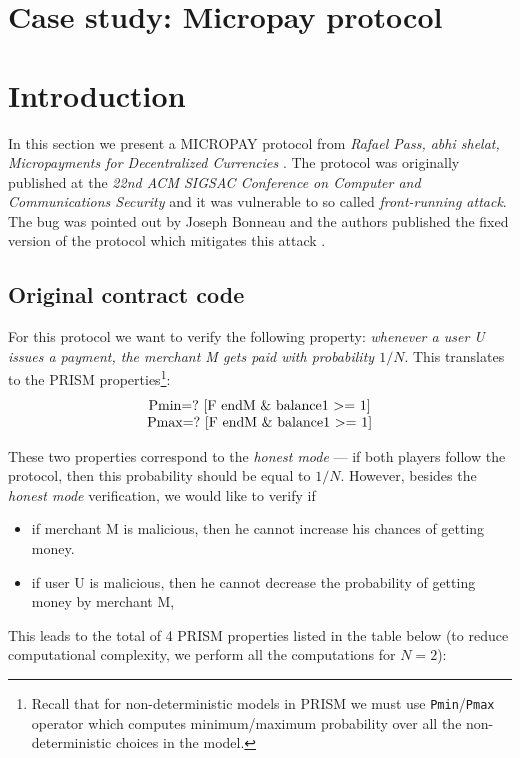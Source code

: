 
\section{Case study: Micropay protocol}

\section{Introduction}

In this section we present a MICROPAY protocol from \emph{Rafael Pass, abhi shelat, 
Micropayments for Decentralized Currencies} \cite{CCS:PasShe15}.
The protocol was originally published at the \emph{22nd ACM SIGSAC Conference on Computer and 
Communications Security} and it was vulnerable to so called \emph{front-running attack}.
The bug was pointed out by Joseph Bonneau and the authors published the fixed version of the protocol
which mitigates this attack \cite{EPRINT:Passhe16}.

\subsection{Original contract code}



For this protocol we want to verify the following property: \emph{whenever a user U issues a payment, 
the merchant M gets paid with probability $1/N$}.
This translates to the PRISM properties\footnote{Recall that for non-deterministic models in PRISM we must use 
\lstinline{Pmin}/\lstinline{Pmax} operator which computes minimum/maximum probability over all the non-deterministic
choices in the model.}:
\[
\begin{tabular}{c}
\lstinline{Pmin=? [F endM & balance1 >= 1]} \\
\lstinline{Pmax=? [F endM & balance1 >= 1]}
\end{tabular}
\]

These two properties correspond to the \emph{honest mode} --- if both players follow the protocol, then this probability
should be equal to $1/N$.
However, besides the \emph{honest mode} verification, we would like to verify if
\begin{itemize}
\item if merchant M is malicious, then he cannot increase his chances of getting money.
\item if user U is malicious, then he cannot decrease the probability of getting money by merchant M,
\end{itemize}
This leads to the total of 4 PRISM properties listed in the table below
(to reduce computational complexity, we perform all the computations for $N = 2$):

